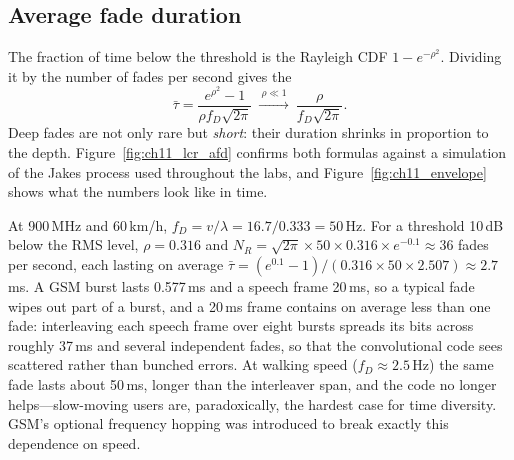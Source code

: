 \subsection{Average fade duration}

The fraction of time below the threshold is the Rayleigh CDF $1-e^{-\rho^2}$. Dividing it by the
number of fades per second gives the 
\begin{equation}
\bar\tau=\frac{e^{\rho^2}-1}{\rho f_D\sqrt{2\pi}}\ \xrightarrow{\ \rho\ll1\ }\ \frac{\rho}{f_D\sqrt{2\pi}}.
\label{eq:ch11:afd}
\end{equation}
Deep fades are not only rare but \emph{short}: their duration shrinks in proportion to the depth.
Figure~\ref{fig:ch11_lcr_afd} confirms both formulas against a simulation of the Jakes process used
throughout the labs, and Figure~\ref{fig:ch11_envelope} shows what the numbers look like in time.



\begin{worked}
At 900\,MHz and 60\,km/h, $f_D=v/\lambda=16.7/0.333=50$\,Hz. For a threshold 10\,dB below the RMS
level, $\rho=0.316$ and
$N_R=\sqrt{2\pi}\times50\times0.316\times e^{-0.1}\approx36$ fades per second, each lasting on average
$\bar\tau=(e^{0.1}-1)/(0.316\times50\times2.507)\approx2.7$\,ms. A GSM burst lasts 0.577\,ms and a speech
frame 20\,ms, so a typical fade wipes out part of a burst, and a 20\,ms frame contains on average
less than one fade: interleaving each speech frame over eight bursts spreads its bits across
roughly 37\,ms and several independent fades, so that the convolutional code sees scattered rather
than bunched errors. At walking speed ($f_D\approx2.5$\,Hz) the same fade lasts about 50\,ms, longer
than the interleaver span, and the code no longer helps---slow-moving users are, paradoxically, the
hardest case for time diversity. GSM's optional frequency hopping was introduced to break exactly
this dependence on speed.
\end{worked}

